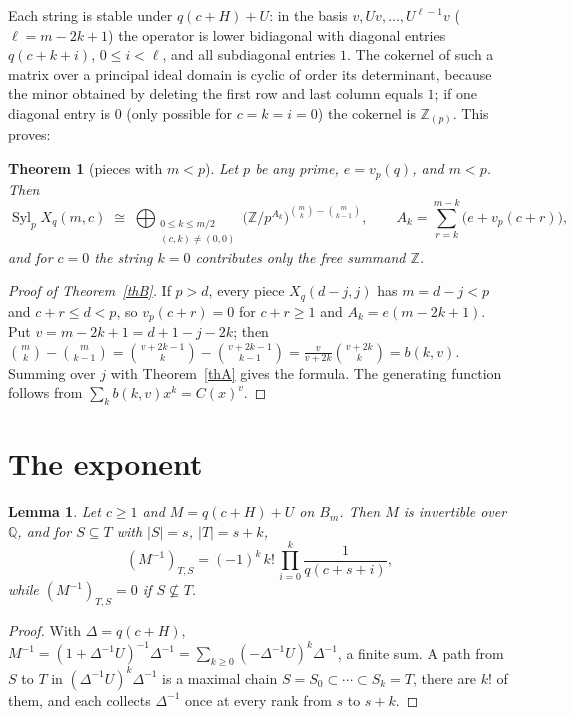 \documentclass[10pt]{article}
\theoremstyle{ds}
\newtheorem{theorem}{Theorem}
\newtheorem{lemma}{Lemma}
\theoremstyle{dsrem}
\newcommand{\Z}{\mathbb{Z}}
\newcommand{\Q}{\mathbb{Q}}
\newcommand{\Syl}{\operatorname{Syl}}
\begin{document}
Each string is stable under $q(c+H)+U$: in the basis $v,Uv,\dots,U^{\ell-1}v$ ($\ell=m-2k+1$) the operator is lower bidiagonal with diagonal entries $q(c+k+i)$, $0\le i<\ell$, and all subdiagonal entries $1$. The cokernel of such a matrix over a principal ideal domain is cyclic of order its determinant, because the minor obtained by deleting the first row and last column equals $1$; if one diagonal entry is $0$ (only possible for $c=k=i=0$) the cokernel is $\Z_{(p)}$. This proves:

\begin{theorem}[pieces with $m<p$]\label{thBprime}
Let $p$ be any prime, $e=v_p(q)$, and $m<p$. Then
\[
\Syl_p X_q(m,c)\;\cong\;\bigoplus_{\substack{0\le k\le m/2\\(c,k)\ne(0,0)}}\big(\Z/p^{A_k}\big)^{\binom mk-\binom m{k-1}},\qquad A_k=\sum_{r=k}^{m-k}\big(e+v_p(c+r)\big),
\]
and for $c=0$ the string $k=0$ contributes only the free summand $\Z$.
\end{theorem}

\begin{proof}[Proof of Theorem~\ref{thB}]
If $p>d$, every piece $X_q(d-j,j)$ has $m=d-j<p$ and $c+r\le d<p$, so $v_p(c+r)=0$ for $c+r\ge1$ and $A_k=e(m-2k+1)$. Put $v=m-2k+1=d+1-j-2k$; then $\binom mk-\binom m{k-1}=\binom{v+2k-1}{k}-\binom{v+2k-1}{k-1}=\frac{v}{v+2k}\binom{v+2k}k=b(k,v)$. Summing over $j$ with Theorem~\ref{thA} gives the formula. The generating function follows from $\sum_kb(k,v)x^k=C(x)^v$.
\end{proof}

\section{The exponent}

\begin{lemma}\label{inverse}
Let $c\ge1$ and $M=q(c+H)+U$ on $B_m$. Then $M$ is invertible over $\Q$, and for $S\subseteq T$ with $|S|=s$, $|T|=s+k$,
\[
(M^{-1})_{T,S}=(-1)^k\,k!\,\prod_{i=0}^{k}\frac1{q(c+s+i)},
\]
while $(M^{-1})_{T,S}=0$ if $S\not\subseteq T$.
\end{lemma}

\begin{proof}
With $\Delta=q(c+H)$, $M^{-1}=(1+\Delta^{-1}U)^{-1}\Delta^{-1}=\sum_{k\ge0}(-\Delta^{-1}U)^k\Delta^{-1}$, a finite sum. A path from $S$ to $T$ in $(\Delta^{-1}U)^k\Delta^{-1}$ is a maximal chain $S=S_0\subset\cdots\subset S_k=T$, there are $k!$ of them, and each collects $\Delta^{-1}$ once at every rank from $s$ to $s+k$.
\end{proof}
\end{document}
